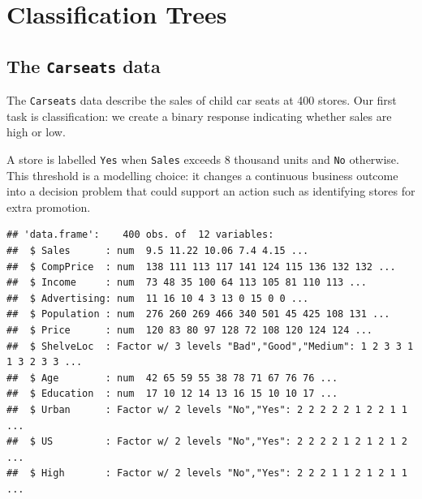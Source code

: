 \documentclass[
  11pt,
]{article}
\newenvironment{Shaded}{\begin{snugshade}}{\end{snugshade}}
\newcommand{\DecValTok}[1]{\textcolor[rgb]{0.00,0.00,0.81}{#1}}
\newcommand{\FunctionTok}[1]{\textcolor[rgb]{0.13,0.29,0.53}{\textbf{#1}}}
\newcommand{\NormalTok}[1]{#1}
\newcommand{\OtherTok}[1]{\textcolor[rgb]{0.56,0.35,0.01}{#1}}
\newcommand{\SpecialCharTok}[1]{\textcolor[rgb]{0.81,0.36,0.00}{\textbf{#1}}}
\newcommand{\StringTok}[1]{\textcolor[rgb]{0.31,0.60,0.02}{#1}}
\begin{document}
\section{Classification Trees}\label{classification-trees}

\subsection{\texorpdfstring{The \texttt{Carseats}
data}{The Carseats data}}\label{the-carseats-data}

The \texttt{Carseats} data describe the sales of child car seats at 400
stores. Our first task is classification: we create a binary response
indicating whether sales are high or low.

A store is labelled \texttt{Yes} when \texttt{Sales} exceeds 8 thousand
units and \texttt{No} otherwise. This threshold is a modelling choice:
it changes a continuous business outcome into a decision problem that
could support an action such as identifying stores for extra promotion.

\begin{Shaded}
\end{Shaded}

\begin{verbatim}
## 'data.frame':    400 obs. of  12 variables:
##  $ Sales      : num  9.5 11.22 10.06 7.4 4.15 ...
##  $ CompPrice  : num  138 111 113 117 141 124 115 136 132 132 ...
##  $ Income     : num  73 48 35 100 64 113 105 81 110 113 ...
##  $ Advertising: num  11 16 10 4 3 13 0 15 0 0 ...
##  $ Population : num  276 260 269 466 340 501 45 425 108 131 ...
##  $ Price      : num  120 83 80 97 128 72 108 120 124 124 ...
##  $ ShelveLoc  : Factor w/ 3 levels "Bad","Good","Medium": 1 2 3 3 1 1 3 2 3 3 ...
##  $ Age        : num  42 65 59 55 38 78 71 67 76 76 ...
##  $ Education  : num  17 10 12 14 13 16 15 10 10 17 ...
##  $ Urban      : Factor w/ 2 levels "No","Yes": 2 2 2 2 2 1 2 2 1 1 ...
##  $ US         : Factor w/ 2 levels "No","Yes": 2 2 2 2 1 2 1 2 1 2 ...
##  $ High       : Factor w/ 2 levels "No","Yes": 2 2 2 1 1 2 1 2 1 1 ...
\end{verbatim}
\end{document}
